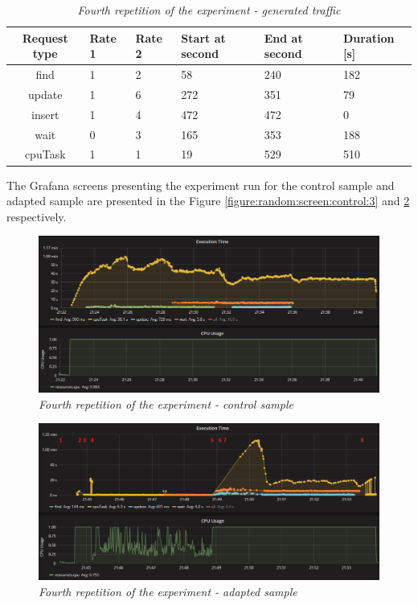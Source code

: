 \documentclass[12pt,a4paper]{article}
\begin{document}
\begin{table}[ht]
\begin{center}
\begin{tabular}{c|C{2cm}|C{2cm}|C{2cm}|C{2cm}|C{2cm}}
Request type & Rate 1 & Rate 2 & Start at second & End at second & Duration [s]\\\hline
find	&1	&2	&58	    &240	&182\\ \hline
update	&1	&6	&272	&351	&79\\ \hline
insert	&1	&4	&472	&472	&0\\ \hline
wait	&0	&3	&165	&353	&188\\ \hline
cpuTask	&1	&1	&19	    &529	&510
\end{tabular}
\end{center}
\caption{\textit{Fourth repetition of the experiment - generated traffic}} \label{table:random:traffic:4}
\end{table}

The Grafana screens presenting the experiment run for the control sample and adapted sample are presented in the Figure \ref{figure:random:screen:control:3} and \ref{figure:random:screen:adapted:4} respectively. 

\begin{figure}[!htb]
\centering
\includegraphics[width=1\textwidth]{4-ctrl}
\caption{\textit{Fourth repetition of the experiment - control sample}} \label{figure:random:screen:control:4}
\end{figure}

\begin{figure}[!htb]
\centering
\includegraphics[width=1\textwidth]{4-adap}
\caption{\textit{Fourth repetition of the experiment - adapted sample}} \label{figure:random:screen:adapted:4}
\end{figure}
\end{document}
